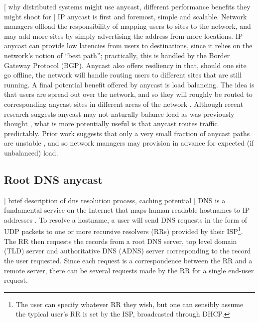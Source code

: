 \documentclass[sigconf,letterpaper,nonacm,10pt]{acmart}
\begin{document}
{[} why distributed systems might use anycast, different performance
benefits they might shoot for {]} IP anycast is first and foremost,
simple and scalable. Network managers offload the responsibility of
mapping users to sites to the network, and may add more sites by simply
advertising the address from more locations. IP anycast can provide low
latencies from users to destinations, since it relies on the network's
notion of ``best path''; practically, this is handled by the Border
Gateway Protocol (BGP). Anycast also offers resiliency in that, should
one site go offline, the network will handle routing users to different
sites that are still running. A final potential benefit offered by
anycast is load balancing. The idea is that users are spread out over
the network, and so they will roughly be routed to corresponding anycast
sites in different areas of the network \cite{metz2002ip}. Although
recent research suggests anycast may not naturally balance load as was
previously thought \cite{li_levin_spring_bhattacharjee_2018}, what is
more potentially useful is that anycast routes traffic predictably.
Prior work suggests that only a very small fraction of anycast paths are
unstable \cite{wei2017does}, and so network managers may provision in
advance for expected (if unbalanced) load.

\hypertarget{root-dns-anycast}{%
\subsection{Root DNS anycast}\label{root-dns-anycast}}

{[} brief description of dns resolution process, caching potential {]}
DNS is a fundamental service on the Internet that maps human readable
hostnames to IP addresses \cite{cloudflare_dns_tutorial, rfc_1035}. To
resolve a hostname, a user will send DNS requests in the form of UDP
packets to one or more recursive resolvers (RRs) provided by their
ISP\footnote{ The user can specify whatever RR they wish, but one can sensibly assume the typical user's RR is set by the ISP, broadcasted through DHCP. }.
The RR then requests the records from a root DNS server, top level
domain (TLD) server and authoritative DNS (ADNS) server corresponding to
the record the user requested. Since each request is a correspondence
between the RR and a remote server, there can be several requests made
by the RR for a single end-user request.
\end{document}
